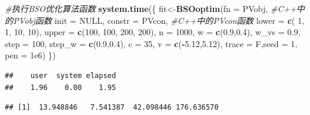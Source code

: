 \documentclass[]{ctexbook}
\newenvironment{Shaded}{\begin{snugshade}}{\end{snugshade}}
\newcommand{\KeywordTok}[1]{\textcolor[rgb]{0.13,0.29,0.53}{\textbf{#1}}}
\newcommand{\DataTypeTok}[1]{\textcolor[rgb]{0.13,0.29,0.53}{#1}}
\newcommand{\DecValTok}[1]{\textcolor[rgb]{0.00,0.00,0.81}{#1}}
\newcommand{\FloatTok}[1]{\textcolor[rgb]{0.00,0.00,0.81}{#1}}
\newcommand{\CommentTok}[1]{\textcolor[rgb]{0.56,0.35,0.01}{\textit{#1}}}
\newcommand{\OtherTok}[1]{\textcolor[rgb]{0.56,0.35,0.01}{#1}}
\newcommand{\OperatorTok}[1]{\textcolor[rgb]{0.81,0.36,0.00}{\textbf{#1}}}
\newcommand{\NormalTok}[1]{#1}
\begin{document}
\begin{Shaded}
\begin{Highlighting}[]
\CommentTok{#执行BSO优化算法函数}
\KeywordTok{system.time}\NormalTok{(\{}
\NormalTok{  fit<-}\KeywordTok{BSOoptim}\NormalTok{(}\DataTypeTok{fn =}\NormalTok{ PVobj, }\CommentTok{#C++中的PVobj函数}
         \DataTypeTok{init =} \OtherTok{NULL}\NormalTok{,}
         \DataTypeTok{constr =}\NormalTok{ PVcon, }\CommentTok{#C++中的PVcon函数}
         \DataTypeTok{lower =} \KeywordTok{c}\NormalTok{( }\DecValTok{1}\NormalTok{, }\DecValTok{1}\NormalTok{, }\DecValTok{10}\NormalTok{, }\DecValTok{10}\NormalTok{),}
         \DataTypeTok{upper =} \KeywordTok{c}\NormalTok{(}\DecValTok{100}\NormalTok{, }\DecValTok{100}\NormalTok{, }\DecValTok{200}\NormalTok{, }\DecValTok{200}\NormalTok{),}
         \DataTypeTok{n =} \DecValTok{1000}\NormalTok{,}
         \DataTypeTok{w =} \KeywordTok{c}\NormalTok{(}\FloatTok{0.9}\NormalTok{,}\FloatTok{0.4}\NormalTok{),}
         \DataTypeTok{w_vs =} \FloatTok{0.9}\NormalTok{,}
         \DataTypeTok{step =} \DecValTok{100}\NormalTok{,}
         \DataTypeTok{step_w =} \KeywordTok{c}\NormalTok{(}\FloatTok{0.9}\NormalTok{,}\FloatTok{0.4}\NormalTok{),}
         \DataTypeTok{c =} \DecValTok{35}\NormalTok{,}
         \DataTypeTok{v =} \KeywordTok{c}\NormalTok{(}\OperatorTok{-}\FloatTok{5.12}\NormalTok{,}\FloatTok{5.12}\NormalTok{),}
         \DataTypeTok{trace =}\NormalTok{ F,}\DataTypeTok{seed =} \DecValTok{1}\NormalTok{,}
         \DataTypeTok{pen =} \FloatTok{1e6}\NormalTok{)}
\NormalTok{\})}
\end{Highlighting}
\end{Shaded}

\begin{verbatim}
##    user  system elapsed 
##    1.96    0.00    1.95
\end{verbatim}

\begin{Shaded}
\end{Shaded}

\begin{verbatim}
## [1]  13.948846   7.541387  42.098446 176.636570
\end{verbatim}

\begin{Shaded}
\end{Shaded}
\end{document}
